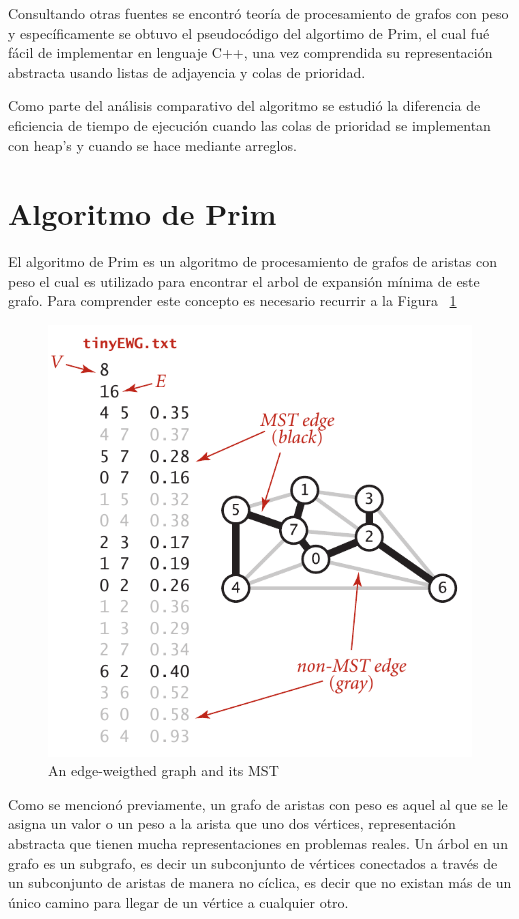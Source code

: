 \documentclass[letterpaper]{article}
\begin{document}
Consultando otras fuentes se encontró teoría de procesamiento de grafos con peso y específicamente se obtuvo el pseudocódigo del algortimo de Prim, el cual fué fácil de implementar en lenguaje C++, una vez comprendida su representación abstracta usando listas de adjayencia y colas de prioridad.

Como parte del análisis comparativo del algoritmo se estudió la diferencia de eficiencia de tiempo de ejecución cuando las colas de prioridad se implementan con heap's y cuando se hace mediante arreglos.

\section{Algoritmo de Prim}

El algoritmo de Prim es un algoritmo de procesamiento de grafos de aristas con peso el cual es utilizado para encontrar el arbol de expansión mínima de este grafo. Para comprender este concepto es necesario recurrir a la Figura ~\ref{fig:MSTree}

\begin{figure}[h]
\includegraphics[width=.35\textwidth]{Images/MSTree.png}
\centering
\caption{An edge-weigthed graph and its MST}
\label{fig:MSTree}
\end{figure}

Como se mencionó previamente, un grafo de aristas con peso es aquel al que se le asigna un valor o un peso a la arista que uno dos vértices, representación abstracta que tienen mucha representaciones en problemas reales. Un árbol en un grafo es un subgrafo, es decir un subconjunto de vértices conectados a través de un subconjunto de aristas de manera no cíclica, es decir que no existan más de un único camino para llegar de un vértice a cualquier otro.\\
\end{document}
